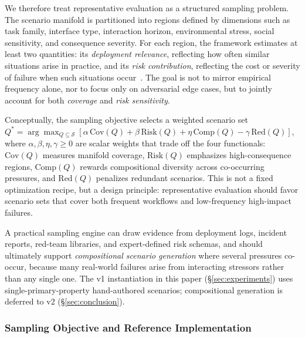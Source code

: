 We therefore treat representative evaluation as a structured sampling problem. The scenario manifold is partitioned into regions defined by dimensions such as task family, interface type, interaction horizon, environmental stress, social sensitivity, and consequence severity. For each region, the framework estimates at least two quantities: its \emph{deployment relevance}, reflecting how often similar situations arise in practice, and its \emph{risk contribution}, reflecting the cost or severity of failure when such situations occur~\cite{koh2021wilds,liang2023helm,kiela2021dynabench,shirali2022dynamicbench}. The goal is not to mirror empirical frequency alone, nor to focus only on adversarial edge cases, but to jointly account for both \emph{coverage} and \emph{risk sensitivity}.

Conceptually, the sampling objective selects a weighted scenario set $Q^{*} = \arg\max_{Q \subseteq \mathcal{S}} [\alpha\,\mathrm{Cov}(Q) + \beta\,\mathrm{Risk}(Q) + \eta\,\mathrm{Comp}(Q) - \gamma\,\mathrm{Red}(Q)]$,
where $\alpha,\beta,\eta,\gamma\ge 0$ are scalar weights that trade off the four functionals: $\mathrm{Cov}(Q)$ measures manifold coverage, $\mathrm{Risk}(Q)$ emphasizes high-consequence regions, $\mathrm{Comp}(Q)$ rewards compositional diversity across co-occurring pressures, and $\mathrm{Red}(Q)$ penalizes redundant scenarios. This is not a fixed optimization recipe, but a design principle: representative evaluation should favor scenario sets that cover both frequent workflows and low-frequency high-impact failures.

A practical sampling engine can draw evidence from deployment logs, incident reports, red-team libraries, and expert-defined risk schemas, and should ultimately support \emph{compositional scenario generation} where several pressures co-occur, because many real-world failures arise from interacting stressors rather than any single one. The v1 instantiation in this paper (\S\ref{sec:experiments}) uses single-primary-property hand-authored scenarios; compositional generation is deferred to v2 (\S\ref{sec:conclusion}).

\subsubsection{Sampling Objective and Reference Implementation}
\label{subsubsec:layer4_reference}

